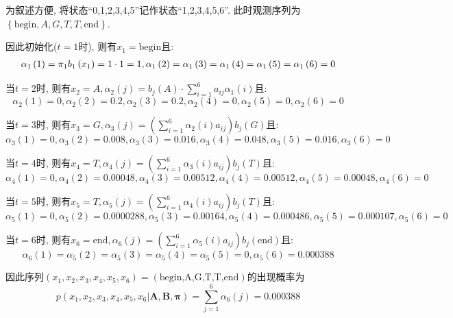 \documentclass{article}
\begin{document}
\begin{homeworkProblem}
	为叙述方便, 将状态“0,1,2,3,4,5”记作状态“1,2,3,4,5,6”. 此时观测序列为$\left\{ \text{begin},A,G,T,T,\text{end} \right\}$.
	
	因此初始化($t=1$时), 则有$x_1=\text{begin}$且:
	\begin{align}
		\alpha _1\left( 1 \right) =\pi _1b_1\left( x_1 \right) =1\cdot 1=1,\alpha _1\left( 2 \right) =\alpha _1\left( 3 \right) =\alpha _1\left( 4 \right) =\alpha _1\left( 5 \right) =\alpha _1\left( 6 \right) =0 \notag
	\end{align}

	当$t=2$时, 则有$\displaystyle x_2=A,\alpha _2\left( j \right) =b_j\left( A \right) \cdot \sum_{i=1}^6{a_{ij}\alpha _1\left( i \right)}	$且:
	$$
	\alpha _2\left( 1 \right) =0,\alpha _2\left( 2 \right) =0.2,\alpha _2\left( 3 \right) =0.2,\alpha _2\left( 4 \right) =0,\alpha _2\left( 5 \right) =0,\alpha _2\left( 6 \right) =0
	$$

	当$t=3$时, 则有$\displaystyle x_3=G,\alpha _3\left( j \right) =\left( \sum_{i=1}^6{\alpha _2\left( i \right) a_{ij}} \right) b_j\left( G \right)$且:
	$$
	\alpha _3\left( 1 \right) =0,\alpha _3\left( 2 \right) =0.008,\alpha _3\left( 3 \right) =0.016,\alpha _3\left( 4 \right) =0.048,\alpha _3\left( 5 \right) =0.016,\alpha _3\left( 6 \right) =0
	$$

	当$t=4$时, 则有$\displaystyle x_4=T,\alpha _4\left( j \right) =\left( \sum_{i=1}^6{\alpha _3\left( i \right) a_{ij}} \right) b_j\left( T \right)$且:
	$$
	\alpha _4\left( 1 \right) =0,\alpha _4\left( 2 \right) =0.00048,\alpha _4\left( 3 \right) =0.00512,\alpha _4\left( 4 \right) =0.00512,\alpha _4\left( 5 \right) =0.00048,\alpha _4\left( 6 \right) =0
	$$

	当$t=5$时, 则有$\displaystyle x_5=T,\alpha _5\left( j \right) =\left( \sum_{i=1}^6{\alpha _4\left( i \right) a_{ij}} \right) b_j\left( T \right)$且:
	$$
	\alpha _5\left( 1 \right) =0,\alpha _5\left( 2 \right) =0.0000288,\alpha _5\left( 3 \right) =0.00164,\alpha _5\left( 4 \right) =0.000486,\alpha _5\left( 5 \right) =0.000107,\alpha _5\left( 6 \right) =0
	$$

	当$t=6$时, 则有$\displaystyle x_6=\text{end},\alpha _6\left( j \right) =\left( \sum_{i=1}^6{\alpha _5\left( i \right) a_{ij}} \right) b_j\left( \text{end} \right)$且:
	$$
	\alpha _6\left( 1 \right) =\alpha _5\left( 2 \right) =\alpha _5\left( 3 \right) =\alpha _5\left( 4 \right) =\alpha _5\left( 5 \right) =0,\alpha _5\left( 6 \right) =0.000388
	$$

	因此序列$(x_1,x_2,x_3,x_4,x_5,x_6)=(\text{begin,A,G,T,T,end})$的出现概率为
	$$
	p\left( x_1,x_2,x_3,x_4,x_5,x_6|\boldsymbol{A},\boldsymbol{B},\boldsymbol{\pi } \right) =\sum_{j=1}^6{\alpha _6\left( j \right)}=0.000388
	$$


\end{homeworkProblem}
\end{document}
